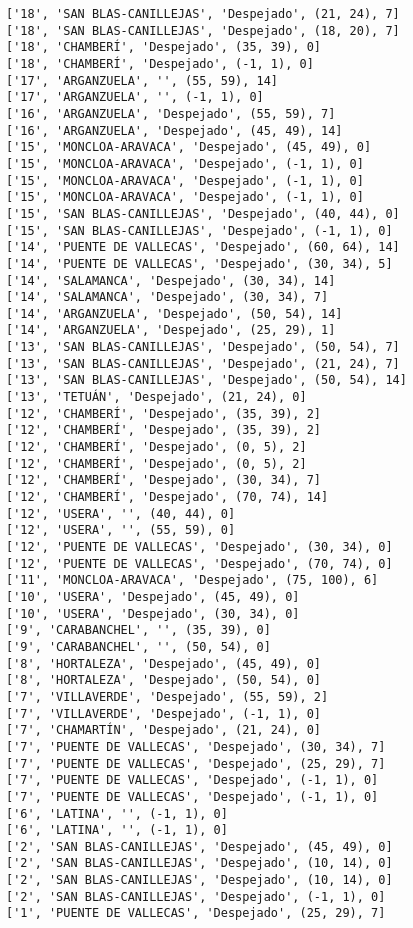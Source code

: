 \documentclass[11pt]{article}
\begin{document}
\begin{Verbatim}[commandchars=\\\{\}]
['18', 'SAN BLAS-CANILLEJAS', 'Despejado', (21, 24), 7]
['18', 'SAN BLAS-CANILLEJAS', 'Despejado', (18, 20), 7]
['18', 'CHAMBERÍ', 'Despejado', (35, 39), 0]
['18', 'CHAMBERÍ', 'Despejado', (-1, 1), 0]
['17', 'ARGANZUELA', '', (55, 59), 14]
['17', 'ARGANZUELA', '', (-1, 1), 0]
['16', 'ARGANZUELA', 'Despejado', (55, 59), 7]
['16', 'ARGANZUELA', 'Despejado', (45, 49), 14]
['15', 'MONCLOA-ARAVACA', 'Despejado', (45, 49), 0]
['15', 'MONCLOA-ARAVACA', 'Despejado', (-1, 1), 0]
['15', 'MONCLOA-ARAVACA', 'Despejado', (-1, 1), 0]
['15', 'MONCLOA-ARAVACA', 'Despejado', (-1, 1), 0]
['15', 'SAN BLAS-CANILLEJAS', 'Despejado', (40, 44), 0]
['15', 'SAN BLAS-CANILLEJAS', 'Despejado', (-1, 1), 0]
['14', 'PUENTE DE VALLECAS', 'Despejado', (60, 64), 14]
['14', 'PUENTE DE VALLECAS', 'Despejado', (30, 34), 5]
['14', 'SALAMANCA', 'Despejado', (30, 34), 14]
['14', 'SALAMANCA', 'Despejado', (30, 34), 7]
['14', 'ARGANZUELA', 'Despejado', (50, 54), 14]
['14', 'ARGANZUELA', 'Despejado', (25, 29), 1]
['13', 'SAN BLAS-CANILLEJAS', 'Despejado', (50, 54), 7]
['13', 'SAN BLAS-CANILLEJAS', 'Despejado', (21, 24), 7]
['13', 'SAN BLAS-CANILLEJAS', 'Despejado', (50, 54), 14]
['13', 'TETUÁN', 'Despejado', (21, 24), 0]
['12', 'CHAMBERÍ', 'Despejado', (35, 39), 2]
['12', 'CHAMBERÍ', 'Despejado', (35, 39), 2]
['12', 'CHAMBERÍ', 'Despejado', (0, 5), 2]
['12', 'CHAMBERÍ', 'Despejado', (0, 5), 2]
['12', 'CHAMBERÍ', 'Despejado', (30, 34), 7]
['12', 'CHAMBERÍ', 'Despejado', (70, 74), 14]
['12', 'USERA', '', (40, 44), 0]
['12', 'USERA', '', (55, 59), 0]
['12', 'PUENTE DE VALLECAS', 'Despejado', (30, 34), 0]
['12', 'PUENTE DE VALLECAS', 'Despejado', (70, 74), 0]
['11', 'MONCLOA-ARAVACA', 'Despejado', (75, 100), 6]
['10', 'USERA', 'Despejado', (45, 49), 0]
['10', 'USERA', 'Despejado', (30, 34), 0]
['9', 'CARABANCHEL', '', (35, 39), 0]
['9', 'CARABANCHEL', '', (50, 54), 0]
['8', 'HORTALEZA', 'Despejado', (45, 49), 0]
['8', 'HORTALEZA', 'Despejado', (50, 54), 0]
['7', 'VILLAVERDE', 'Despejado', (55, 59), 2]
['7', 'VILLAVERDE', 'Despejado', (-1, 1), 0]
['7', 'CHAMARTÍN', 'Despejado', (21, 24), 0]
['7', 'PUENTE DE VALLECAS', 'Despejado', (30, 34), 7]
['7', 'PUENTE DE VALLECAS', 'Despejado', (25, 29), 7]
['7', 'PUENTE DE VALLECAS', 'Despejado', (-1, 1), 0]
['7', 'PUENTE DE VALLECAS', 'Despejado', (-1, 1), 0]
['6', 'LATINA', '', (-1, 1), 0]
['6', 'LATINA', '', (-1, 1), 0]
['2', 'SAN BLAS-CANILLEJAS', 'Despejado', (45, 49), 0]
['2', 'SAN BLAS-CANILLEJAS', 'Despejado', (10, 14), 0]
['2', 'SAN BLAS-CANILLEJAS', 'Despejado', (10, 14), 0]
['2', 'SAN BLAS-CANILLEJAS', 'Despejado', (-1, 1), 0]
['1', 'PUENTE DE VALLECAS', 'Despejado', (25, 29), 7]

\end{Verbatim}
\end{document}
